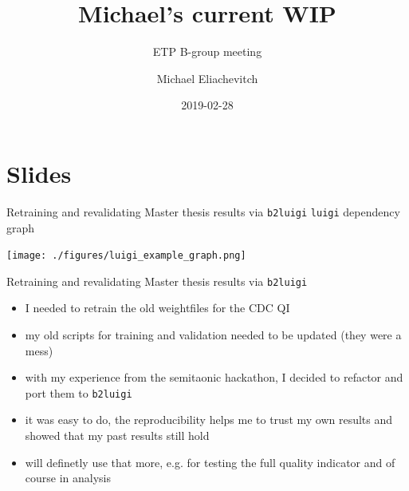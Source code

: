 \documentclass[presentation]{etp-beamer-fancy}
\author{Michael Eliachevitch}
\date{2019-02-28}
\title{Michael's current WIP}
\subtitle{ETP B-group meeting}
\institute{ETP -- KIT}
\begin{document}
\maketitle
\section*{Slides}
\label{sec:org361cadc}
\begin{frame}[label={sec:org08e928c},fragile]{Retraining and revalidating Master thesis results via \texttt{b2luigi}}
 \texttt{luigi} dependency graph
\begin{center}
\texttt{[image: ./figures/luigi\_example\_graph.png]}
\end{center}
\end{frame}

\begin{frame}[label={sec:org249767b},fragile]{Retraining and revalidating Master thesis results via \texttt{b2luigi}}
 \begin{itemize}
\item I needed to retrain the old weightfiles for the CDC QI
\item my old scripts for training and validation needed to be updated (they were a mess)
\item with my experience from the semitaonic hackathon, I decided to refactor and port them to \texttt{b2luigi}
\item it was easy to do, the reproducibility helps me to trust my own results and showed that my past results still hold
\item will definetly use that more, e.g. for testing the full quality indicator and of course in analysis
\end{itemize}
\end{frame}
\end{document}
